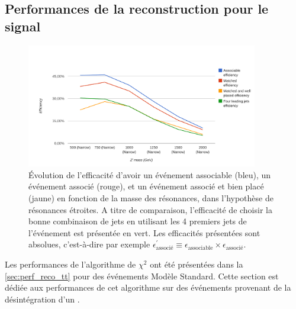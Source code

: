 \subsection{Performances de la reconstruction pour le signal}

\begin{figure}[tbp]
  \centering
  \includegraphics[width=0.9\textwidth]{chapitre7/figs/chi2_eff_vs_zprime_mass.pdf}
  \caption{Évolution de l'efficacité d'avoir un événement associable (bleu), un événement associé (rouge), et un événement associé et bien placé (jaune) en fonction de la masse des résonances, dans l'hypothèse de résonances étroites. A titre de comparaison, l'efficacité de choisir la bonne combinaison de jets en utilisant les 4 premiers jets de l'événement est présentée en vert. Les efficacités présentées sont absolues, c'est-à-dire par exemple $\epsilon^\prime_\text{associé} \equiv \epsilon_\text{associable} \times \epsilon_\text{associé}$.}
  \label{fig:eff_vs_zprime}
\end{figure}

Les performances de l'algorithme de $\chi^2$ ont été présentées dans la \cref{sec:perf_reco_tt} pour des événements \ttbar Modèle Standard. Cette section est dédiée aux performances de cet algorithme sur des événements \ttbar provenant de la désintégration d'un \zprime.

